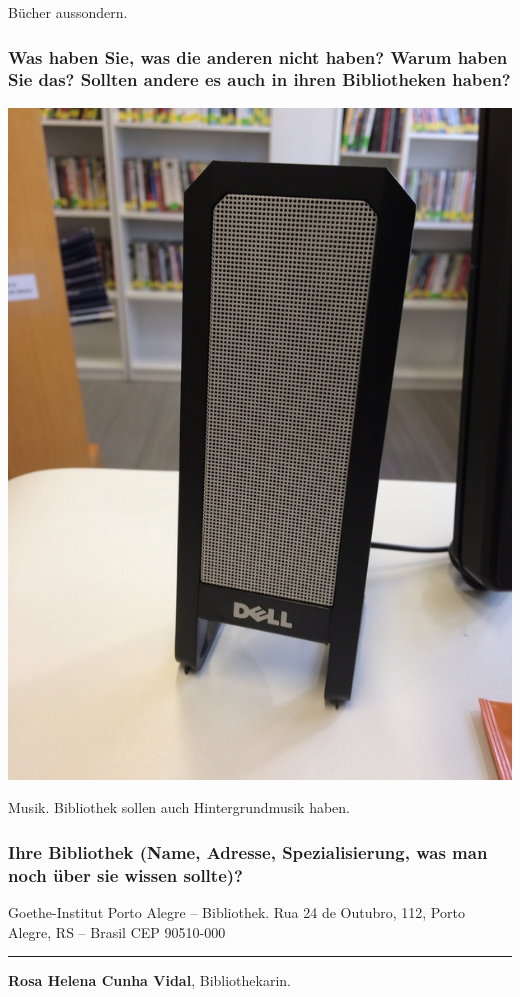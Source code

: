 Bücher aussondern.

\hypertarget{was-haben-sie-was-die-anderen-nicht-haben-warum-haben-sie-das-sollten-andere-es-auch-in-ihren-bibliotheken-haben}{%
\subsubsection*{Was haben Sie, was die anderen nicht haben? Warum haben Sie
das? Sollten andere es auch in ihren Bibliotheken
haben?}\label{was-haben-sie-was-die-anderen-nicht-haben-warum-haben-sie-das-sollten-andere-es-auch-in-ihren-bibliotheken-haben}}

\begin{center}
\includegraphics{gi-porto-alegre/img/musica.jpg}
\end{center}

Musik. Bibliothek sollen auch Hintergrundmusik haben.

\hypertarget{ihre-bibliothek-name-adresse-spezialisierung-was-man-noch-uxfcber-sie-wissen-sollte}{%
\subsubsection*{Ihre Bibliothek (Name, Adresse, Spezialisierung, was man noch
über sie wissen
sollte)?}\label{ihre-bibliothek-name-adresse-spezialisierung-was-man-noch-uxfcber-sie-wissen-sollte}}

Goethe-Institut Porto Alegre -- Bibliothek. Rua 24 de Outubro, 112,
Porto Alegre, RS -- Brasil CEP 90510-000

\begin{center}\rule{0.5\linewidth}{\linethickness}\end{center}

\textbf{Rosa Helena Cunha Vidal}, Bibliothekarin.
